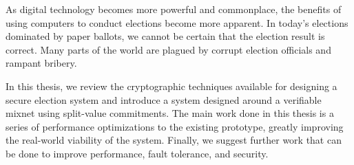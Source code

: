 %
%
%

As digital technology becomes more powerful and commonplace, the benefits of using computers to conduct elections become more apparent. In today's elections dominated by paper ballots, we cannot be certain that the election result is correct. Many parts of the world are plagued by corrupt election officials and rampant bribery.

In this thesis, we review the cryptographic techniques available for designing a secure election system and introduce a system designed around a verifiable mixnet using split-value commitments. The main work done in this thesis is a series of performance optimizations to the existing prototype, greatly improving the real-world viability of the system. Finally, we suggest further work that can be done to improve performance, fault tolerance, and security.
